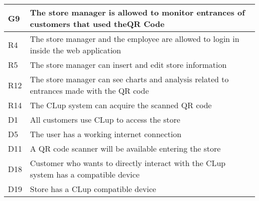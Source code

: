 \begin{center}
        {\renewcommand{\arraystretch}{1.5}
        \begin{longtable}{L{2cm}L{12cm}}
            \hline
            \textbf{G9} & \textbf{The store manager is allowed to monitor entrances of customers that used theQR Code} \\
            \hline
             R4 & The store manager and the employee are allowed to login in inside the web application \\
            \hline
             R5 & The store manager can insert and edit store information \\
            \hline
             R12 & The store manager can see charts and analysis related to entrances made with the QR code \\
            \hline
             R14 & The CLup system can acquire the scanned QR code \\
            \hline
             D1 & All customers use CLup to access the store \\
            \hline
             D5 & The user has a working internet connection \\
            \hline
             D11 & A QR code scanner will be available entering the store \\
            \hline
             D18 & Customer who wants to directly interact with the CLup system has a compatible device \\
            \hline
             D19 & Store has a CLup compatible device \\
            \hline
        \end{longtable}}


\end{center}
